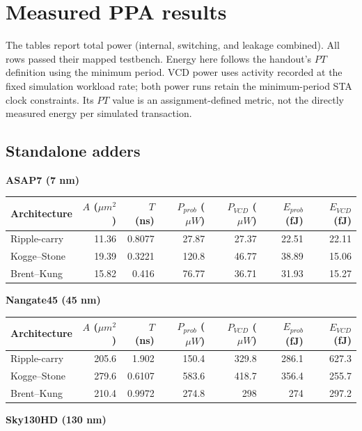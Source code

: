 \documentclass[10pt,letterpaper]{article}
\begin{document}
\section{Measured PPA results}
The tables report total power (internal, switching, and leakage combined).
All rows passed their mapped testbench. Energy here follows the handout's
$PT$ definition using the minimum period. VCD power uses activity recorded
at the fixed simulation workload rate; both power runs retain the
minimum-period STA clock constraints. Its $PT$ value is an assignment-defined
metric, not the directly measured energy per simulated transaction.


\subsection{Standalone adders}

\textbf{ASAP7 (7 nm)}

\begin{center}\small
\begin{tabular}{lrrrrrr}
\toprule
Architecture & $A$ ($\mu m^2$) & $T$ (ns) & $P_{prob}$ ($\mu W$) & $P_{VCD}$ ($\mu W$) & $E_{prob}$ (fJ) & $E_{VCD}$ (fJ) \\
\midrule
Ripple-carry & 11.36 & 0.8077 & 27.87 & 27.37 & 22.51 & 22.11 \\
Kogge--Stone & 19.39 & 0.3221 & 120.8 & 46.77 & 38.89 & 15.06 \\
Brent--Kung & 15.82 & 0.416 & 76.77 & 36.71 & 31.93 & 15.27 \\
\bottomrule
\end{tabular}
\end{center}

\textbf{Nangate45 (45 nm)}

\begin{center}\small
\begin{tabular}{lrrrrrr}
\toprule
Architecture & $A$ ($\mu m^2$) & $T$ (ns) & $P_{prob}$ ($\mu W$) & $P_{VCD}$ ($\mu W$) & $E_{prob}$ (fJ) & $E_{VCD}$ (fJ) \\
\midrule
Ripple-carry & 205.6 & 1.902 & 150.4 & 329.8 & 286.1 & 627.3 \\
Kogge--Stone & 279.6 & 0.6107 & 583.6 & 418.7 & 356.4 & 255.7 \\
Brent--Kung & 210.4 & 0.9972 & 274.8 & 298 & 274 & 297.2 \\
\bottomrule
\end{tabular}
\end{center}

\textbf{Sky130HD (130 nm)}
\end{document}
